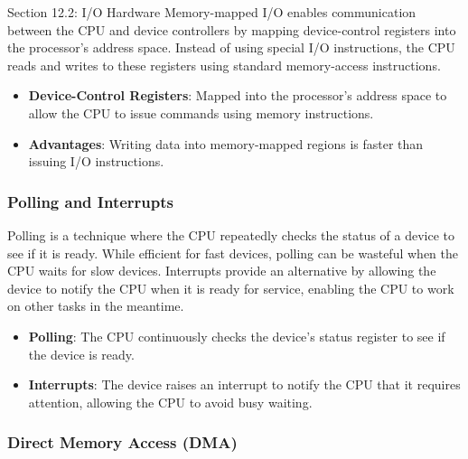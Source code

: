 \begin{notes}{Section 12.2: I/O Hardware}
    Memory-mapped I/O enables communication between the CPU and device controllers by mapping device-control registers into the processor's address space. Instead of using special I/O instructions, the 
    CPU reads and writes to these registers using standard memory-access instructions.
    
    \begin{highlight}
    
        \begin{itemize}
            \item \textbf{Device-Control Registers}: Mapped into the processor’s address space to allow the CPU to issue commands using memory instructions.
            \item \textbf{Advantages}: Writing data into memory-mapped regions is faster than issuing I/O instructions.
        \end{itemize}
    
    \end{highlight}
    
    \subsubsection*{Polling and Interrupts}
    
    Polling is a technique where the CPU repeatedly checks the status of a device to see if it is ready. While efficient for fast devices, polling can be wasteful when the CPU waits for slow devices. 
    Interrupts provide an alternative by allowing the device to notify the CPU when it is ready for service, enabling the CPU to work on other tasks in the meantime.
    
    \begin{highlight}
    
        \begin{itemize}
            \item \textbf{Polling}: The CPU continuously checks the device's status register to see if the device is ready.
            \item \textbf{Interrupts}: The device raises an interrupt to notify the CPU that it requires attention, allowing the CPU to avoid busy waiting.
        \end{itemize}
    
    \end{highlight}
    
    \subsubsection*{Direct Memory Access (DMA)}
    

\end{notes}
